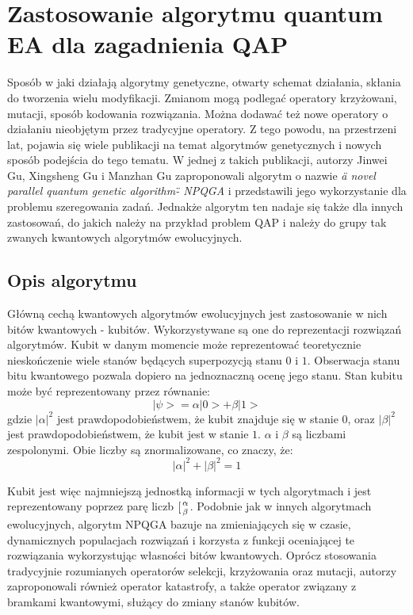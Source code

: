 \chapter{Zastosowanie algorytmu quantum EA dla zagadnienia QAP}
Sposób w jaki działają algorytmy genetyczne, otwarty schemat działania, skłania do tworzenia wielu modyfikacji. Zmianom mogą podlegać operatory krzyżowani, mutacji, sposób kodowania rozwiązania. Można dodawać też nowe operatory o działaniu nieobjętym przez tradycyjne operatory. Z tego powodu, na przestrzeni lat, pojawia się wiele publikacji na temat algorytmów genetycznych i nowych sposób podejścia do tego tematu. W jednej z takich publikacji, autorzy Jinwei Gu, Xingsheng Gu i Manzhan Gu zaproponowali algorytm o nazwie \textit{\"a novel parallel quantum genetic algorithm\" - NPQGA} i przedstawili jego wykorzystanie dla problemu szeregowania zadań. Jednakże algorytm ten nadaje się także dla innych zastosowań, do jakich należy na przykład problem QAP i należy do grupy tak zwanych kwantowych algorytmów ewolucyjnych.

\section{Opis algorytmu}
Główną cechą kwantowych algorytmów ewolucyjnych jest zastosowanie w nich bitów kwantowych - kubitów. Wykorzystywane są one do reprezentacji rozwiązań algorytmów. Kubit w danym momencie może reprezentować teoretycznie nieskończenie wiele stanów będących superpozycją stanu $0$ i $1$. Obserwacja stanu bitu kwantowego pozwala dopiero na jednoznaczną ocenę jego stanu. Stan kubitu może być reprezentowany przez równanie:
\newline
\begin{equation}
|\psi>=\alpha|0>+\beta|1>
\end{equation}
\newline
gdzie $|\alpha|^2$ jest prawdopodobieństwem, że kubit znajduje się w stanie $0$, oraz $|\beta|^2$ jest prawdopodobieństwem, że kubit jest w stanie $1$. $\alpha$ i $\beta$ są liczbami zespolonymi. Obie liczby są znormalizowane, co znaczy, że:
\newline
\begin{equation}
|\alpha|^2+|\beta|^2=1
\end{equation}
\newline 

Kubit jest więc najmniejszą jednostką informacji w tych algorytmach i jest reprezentowany poprzez parę liczb $[{\alpha \atop \beta}$. Podobnie jak w innych algorytmach ewolucyjnych, algorytm NPQGA bazuje na zmieniających się w czasie, dynamicznych populacjach rozwiązań i korzysta z funkcji oceniającej te rozwiązania wykorzystując własności bitów kwantowych. Oprócz stosowania tradycyjnie rozumianych operatorów selekcji, krzyżowania oraz mutacji, autorzy zaproponowali również operator katastrofy, a także operator związany z bramkami kwantowymi, służący do zmiany stanów kubitów.

